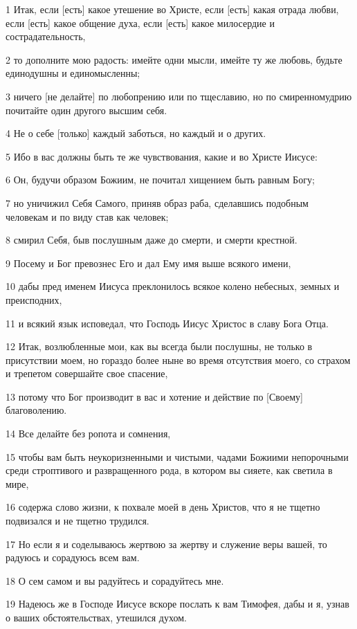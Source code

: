 \par 1 Итак, если [есть] какое утешение во Христе, если [есть] какая отрада любви, если [есть] какое общение духа, если [есть] какое милосердие и сострадательность,
\par 2 то дополните мою радость: имейте одни мысли, имейте ту же любовь, будьте единодушны и единомысленны;
\par 3 ничего [не делайте] по любопрению или по тщеславию, но по смиренномудрию почитайте один другого высшим себя.
\par 4 Не о себе [только] каждый заботься, но каждый и о других.
\par 5 Ибо в вас должны быть те же чувствования, какие и во Христе Иисусе:
\par 6 Он, будучи образом Божиим, не почитал хищением быть равным Богу;
\par 7 но уничижил Себя Самого, приняв образ раба, сделавшись подобным человекам и по виду став как человек;
\par 8 смирил Себя, быв послушным даже до смерти, и смерти крестной.
\par 9 Посему и Бог превознес Его и дал Ему имя выше всякого имени,
\par 10 дабы пред именем Иисуса преклонилось всякое колено небесных, земных и преисподних,
\par 11 и всякий язык исповедал, что Господь Иисус Христос в славу Бога Отца.
\par 12 Итак, возлюбленные мои, как вы всегда были послушны, не только в присутствии моем, но гораздо более ныне во время отсутствия моего, со страхом и трепетом совершайте свое спасение,
\par 13 потому что Бог производит в вас и хотение и действие по [Своему] благоволению.
\par 14 Все делайте без ропота и сомнения,
\par 15 чтобы вам быть неукоризненными и чистыми, чадами Божиими непорочными среди строптивого и развращенного рода, в котором вы сияете, как светила в мире,
\par 16 содержа слово жизни, к похвале моей в день Христов, что я не тщетно подвизался и не тщетно трудился.
\par 17 Но если я и соделываюсь жертвою за жертву и служение веры вашей, то радуюсь и сорадуюсь всем вам.
\par 18 О сем самом и вы радуйтесь и сорадуйтесь мне.
\par 19 Надеюсь же в Господе Иисусе вскоре послать к вам Тимофея, дабы и я, узнав о ваших обстоятельствах, утешился духом.
